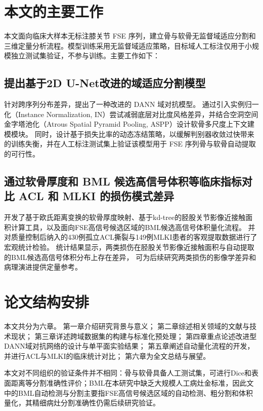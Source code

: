\section{本文的主要工作}
  本文面向临床大样本无标注膝关节 FSE 序列，建立骨与软骨无监督域适应分割和三维定量分析流程。模型训练采用无监督域适应策略，目标域人工标注仅用于小规模独立测试集验证，不参与训练。主要工作如下：
  \subsection{提出基于2D U-Net改进的域适应分割模型}
    针对跨序列分布差异，提出了一种改进的 DANN 域对抗模型。
    通过引入实例归一化（Instance Normalization, IN）尝试减弱底层对比度风格差异，并结合空洞空间金字塔池化（Atrous Spatial Pyramid Pooling, ASPP）设计软骨多尺度上下文建模模块。
    同时，设计基于损失比率的动态冻结策略，以缓解判别器收敛过快带来的训练失衡，并在人工标注测试集上验证该模型用于 FSE 序列骨与软骨自动提取的可行性。
  \subsection{通过软骨厚度和 BML 候选高信号体积等临床指标对比 ACL 和 MLKI 的损伤模式差异}
    开发了基于欧氏距离变换的软骨厚度映射、基于kd-tree的胫股关节影像近接触面积计算工具，以及面向FSE高信号候选区域的BML候选高信号体积量化流程。
    并对质量控制后纳入的430例孤立ACL撕裂与149例MLKI患者的客观提取数据进行了宏观统计检验。
    统计结果显示，两类损伤在胫股关节影像近接触面积与自动提取的BML候选高信号体积分布上存在差异，
    可为后续研究两类损伤的影像学差异和病理演进提供定量参考。

\section{论文结构安排}
  本文共分为六章。
  第一章介绍研究背景与意义；
  第二章综述相关领域的文献与技术现状；
  第三章详述跨域数据集的构建与标准化预处理；
  第四章重点论述改进型DANN域对抗网络的设计与单平面实验结果；
  第五章阐述自动量化流程的开发，并进行ACL与MLKI的临床统计对比；
  第六章为全文总结与展望。
  \par 本文对不同组织的验证条件并不相同：骨与软骨具备人工测试集，可进行Dice和表面距离等分割准确性评价；BML在本研究中缺乏大规模人工病灶金标准，因此文中的BML自动检测与分割主要指FSE高信号候选区域的自动检测、粗分割和体积量化，其精细病灶分割准确性仍需后续研究验证。
